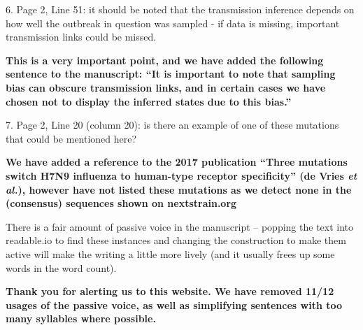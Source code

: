 \documentclass[11pt,oneside,letterpaper]{article}
\begin{document}
6. Page 2, Line 51: it should be noted that the transmission inference depends on how well the outbreak in question was sampled - if data is missing, important transmission links could be missed.

\textbf{This is a very important point, and we have added the following sentence to the manuscript: ``It is important to note that sampling bias can obscure transmission links, and in certain cases we have chosen not to display the inferred states due to this bias.''}

7. Page 2, Line 20 (column 20): is there an example of one of these mutations that could be mentioned here?

\textbf{We have added a reference to the 2017 publication ``Three mutations switch H7N9 influenza to human-type receptor specificity'' (de Vries \textit{et al.}), however have not listed these mutations as we detect none in the (consensus) sequences shown on nextstrain.org}

There is a fair amount of passive voice in the manuscript -- popping the text into readable.io to find these instances and changing the construction to make them active will make the writing a little more lively (and it usually frees up some words in the word count).

\textbf{Thank you for alerting us to this website. We have removed 11/12 usages of the passive voice, as well as simplifying sentences with too many syllables where possible.}
\end{document}
